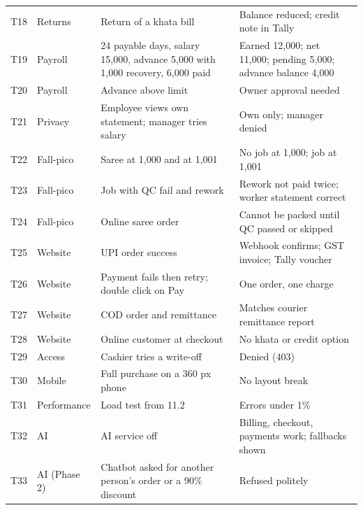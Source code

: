 \documentclass[11pt,a4paper]{article}
\begin{document}
{\begin{longtable}{L{1cm}L{2cm}L{6cm}L{7.5cm}}
T18 & Returns & Return of a khata bill & Balance reduced; credit note in Tally \\
T19 & Payroll & 24 payable days, salary 15,000, advance 5,000 with 1,000 recovery, 6,000 paid & Earned 12,000; net 11,000; pending 5,000; advance balance 4,000 \\
T20 & Payroll & Advance above limit & Owner approval needed \\
T21 & Privacy & Employee views own statement; manager tries salary & Own only; manager denied \\
T22 & Fall-pico & Saree at 1,000 and at 1,001 & No job at 1,000; job at 1,001 \\
T23 & Fall-pico & Job with QC fail and rework & Rework not paid twice; worker statement correct \\
T24 & Fall-pico & Online saree order & Cannot be packed until QC passed or skipped \\
T25 & Website & UPI order success & Webhook confirms; GST invoice; Tally voucher \\
T26 & Website & Payment fails then retry; double click on Pay & One order, one charge \\
T27 & Website & COD order and remittance & Matches courier remittance report \\
T28 & Website & Online customer at checkout & No khata or credit option \\
T29 & Access & Cashier tries a write-off & Denied (403) \\
T30 & Mobile & Full purchase on a 360 px phone & No layout break \\
T31 & Performance & Load test from 11.2 & Errors under 1\% \\
T32 & AI & AI service off & Billing, checkout, payments work; fallbacks shown \\
T33 & AI (Phase 2) & Chatbot asked for another person's order or a 90\% discount & Refused politely \\
\end{longtable}
}
\end{document}
